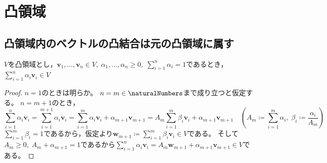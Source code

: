 \chapter{凸領域}
    \section{凸領域内のベクトルの凸結合は元の凸領域に属す}
        \begin{shadebox}
            $V$を凸領域とし，$\bm{v}_1,\dotsc,\bm{v}_n\in V,\;\alpha_1,\dotsc,\alpha_n\geq 0,\;\sum_{i=1}^n\alpha_i = 1$であるとき，$\sum_{i=1}^n\alpha_i\bm{v}_i \in V$
        \end{shadebox}
        \begin{proof}
            \quad\par
            $n=1$のときは明らか。
            $n=m\in\naturalNumbers$まで成り立つと仮定する。
            $n=m+1$のとき，
            \[ \sum_{i=1}^n\alpha_i\bm{v}_i = \sum_{i=1}^{m+1}\alpha_i\bm{v}_i = \sum_{i=1}^m\alpha_i\bm{v}_i + \alpha_{m+1}\bm{v}_{m+1} = A_m\sum_{i=1}^m\beta_i\bm{v}_i + \alpha_{m+1}\bm{v}_{m+1} \quad \left(A_m \coloneq \sum_{i=1}^m\alpha_i,\;\beta_i \coloneq \frac{\alpha_i}{A_m}\right) \]
            $\sum_{i=1}^m\beta_i = 1$であるから，仮定より$\bm{w}_{m+1} \coloneq \sum_{i=1}^m\beta_i\bm{v}_i\in V$である。
            そして$A_m\geq 0,\;A_m + \alpha_{m+1} = 1$であるから$\sum_{i=1}^n\alpha_i\bm{v}_i = A_m\bm{w}_{m+1} + \alpha_{m+1}\bm{v}_{m+1} \in V$である。
        \end{proof}